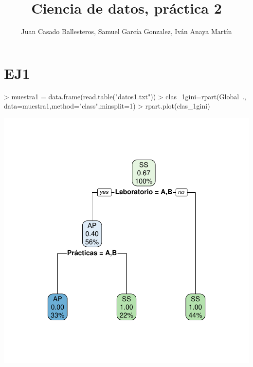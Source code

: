 \documentclass [a4paper] {article}
\title{Ciencia de datos, práctica 2}
\author{Juan Casado Ballesteros, Samuel García Gonzalez, Iván Anaya Martín}
\begin{document}
\maketitle

\begin{abstract}

\end{abstract}

\newpage
\tableofcontents
\newpage


\section{EJ1}

\begin{center}
\begin{Schunk}
\begin{Sinput}
> muestra1 = data.frame(read.table("datos1.txt"))
> clas_1gini=rpart(Global~., data=muestra1,method="class",minsplit=1)
> rpart.plot(clas_1gini)
\end{Sinput}
\end{Schunk}
\includegraphics{entrega2-rpart1_gini}
\end{center}
\end{document}
